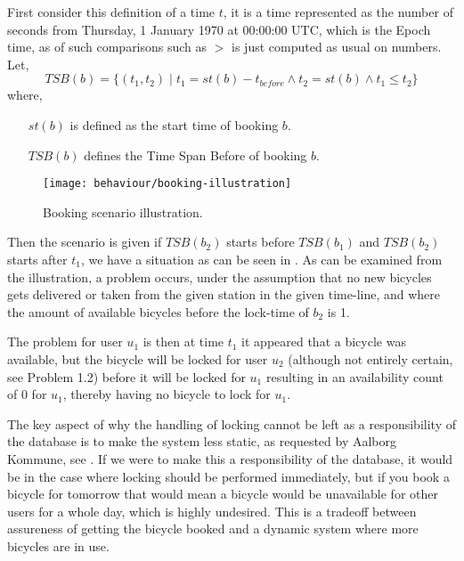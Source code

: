First consider this definition of a time $t$, it is a time represented as the number of seconds from Thursday, 1 January 1970 at 00:00:00 UTC, which is the Epoch time, as of such comparisons such as $>$ is just computed as usual on numbers.
Let, 
$$TSB(b) = \{(t_1,t_2) \;| \;t_1 = st(b) - t_{before} \land t_2 = st(b) \land t_1 \leq t_2 \}$$
where,
\begin{itemize}[align = left]
	\item[$st(b)$] is defined as the start time of booking $b$.
	\item[$TSB(b)$] defines the Time Span Before of booking $b$.
\end{itemize} 

\begin{figure}[h]
	\centering
	\texttt{[image: behaviour/booking-illustration]}
	\caption{Booking scenario illustration.}\label{fig:booking-illustartion}
\end{figure}
Then the scenario is given if $TSB(b_2)$ starts before $TSB(b_1)$ and $TSB(b_2)$ starts after $t_1$, we have a situation as can be seen in .
As can be examined from the illustration, a problem occurs, under the assumption that no new bicycles gets delivered or taken from the given station in the given time-line, and where the amount of available bicycles before the lock-time of $b_2$ is 1.

The problem for user $u_1$ is then at time $t_1$ it appeared that a bicycle was available, but the bicycle will be locked for user $u_2$ (although not entirely certain, see Problem 1.2) before it will be locked for $u_1$ resulting in an availability count of 0 for $u_1$, thereby having no bicycle to lock for $u_1$.

The key aspect of why the handling of locking cannot be left as a responsibility of the database is to make the system less static, as requested by Aalborg Kommune, see .
If we were to make this a responsibility of the database, it would be in the case where locking should be performed immediately, but if you book a bicycle for tomorrow that would mean a bicycle would be unavailable for other users for a whole day, which is highly undesired.
This is a tradeoff between assureness of getting the bicycle booked and a dynamic system where more bicycles are in use.